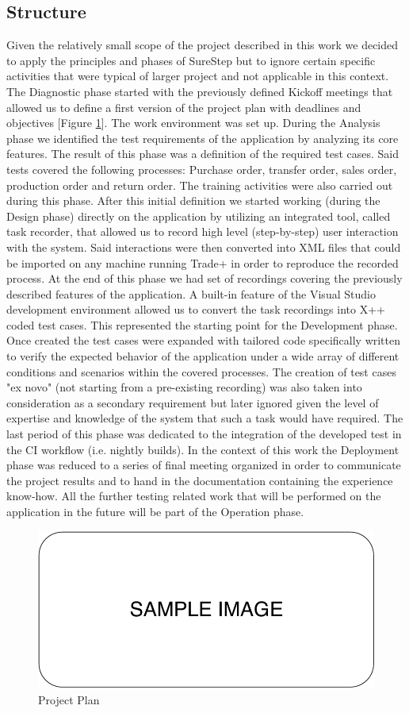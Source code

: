 \subsection{Structure}

Given the relatively small scope of the project described in this work we decided to apply the principles and phases of SureStep but to ignore certain specific activities that were typical of larger project and not applicable in this context. The Diagnostic phase started with the previously defined Kickoff meetings that allowed us to define a first version of the project plan with deadlines and objectives [Figure \ref{fig:projectPlan}]. The work environment was set up. During the Analysis phase we identified the test requirements of the application by analyzing its core features. The result of this phase was a definition of the required test cases. Said tests covered the following processes: Purchase order, transfer order, sales order, production order and return order. The training activities were also carried out during this phase. After this initial definition we started working (during the Design phase) directly on the application by utilizing an integrated tool, called task recorder, that allowed us to record high level (step-by-step) user interaction with the system. Said interactions were then converted into XML files that could be imported on any machine running Trade+ in order to reproduce the recorded process. At the end of this phase we had set of recordings covering the previously described features of the application. A built-in feature of the Visual Studio development environment allowed us to convert the task recordings into X++ coded test cases. This represented the starting point for the Development phase. Once created the test cases were expanded with tailored code specifically written to verify the expected behavior of the application under a wide array of different conditions and scenarios within the covered processes. The creation of test cases "ex novo" (not starting from a pre-existing recording) was also taken into consideration as a secondary requirement but later ignored given the level of expertise and knowledge of the system that such a task would have required. The last period of this phase was dedicated to the integration of the developed test in the CI workflow (i.e. nightly builds). In the context of this work the Deployment phase was reduced to a series of final meeting organized in order to communicate the project results and to hand in the documentation containing the experience know-how. All the further testing related work that will be performed on the application in the future will be part of the Operation phase.

\begin{figure}[ht]
	\centering
	\includegraphics[scale=0.7]{Images/SampleImage.pdf}
	\caption{Project Plan}
	\label{fig:projectPlan}
\end{figure}